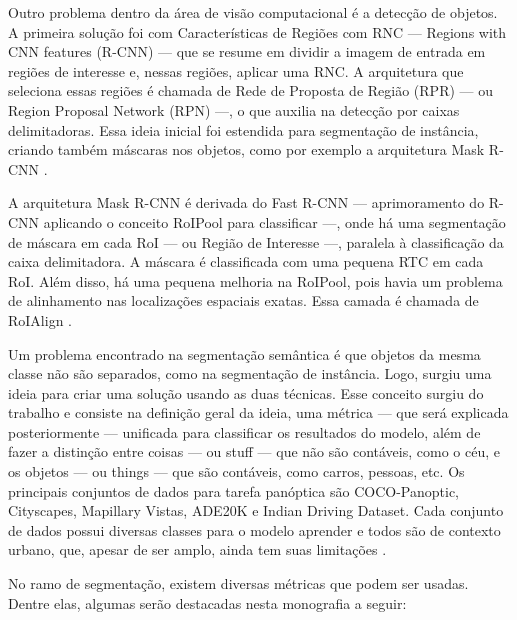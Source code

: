 Outro problema dentro da área de visão computacional é a detecção de objetos. A primeira solução foi com Características de Regiões com RNC — Regions with CNN features (R-CNN) — que se resume em dividir a imagem de entrada em regiões de interesse e, nessas regiões, aplicar uma RNC. A arquitetura que seleciona essas regiões é chamada de Rede de Proposta de Região (RPR) — ou Region Proposal Network (RPN) —, o que auxilia na detecção por caixas delimitadoras. Essa ideia inicial foi estendida para segmentação de instância, criando também máscaras nos objetos, como por exemplo a arquitetura Mask R-CNN \space\cite{dp_semantic_segmantation, lapix}.

A arquitetura Mask R-CNN é derivada do Fast R-CNN — aprimoramento do R-CNN aplicando o conceito RoIPool para classificar —, onde há uma segmentação de máscara em cada RoI — ou Região de Interesse —, paralela à classificação da caixa delimitadora. A máscara é classificada com uma pequena RTC em cada RoI. Além disso, há uma pequena melhoria na RoIPool, pois havia um problema de alinhamento nas localizações espaciais exatas. Essa camada é chamada de RoIAlign \space\cite{maskRCNN}.


Um problema encontrado na segmentação semântica é que objetos da mesma classe não são separados, como na segmentação de instância. Logo, surgiu uma ideia para criar uma solução usando as duas técnicas. Esse conceito surgiu do trabalho  e consiste na definição geral da ideia, uma métrica — que será explicada posteriormente — unificada para classificar os resultados do modelo, além de fazer a distinção entre coisas — ou stuff — que não são contáveis, como o céu, e os objetos — ou things — que são contáveis, como carros, pessoas, etc.
Os principais conjuntos de dados para tarefa panóptica são COCO-Panoptic, Cityscapes, Mapillary Vistas, ADE20K e Indian Driving Dataset. Cada conjunto de dados possui diversas classes para o modelo aprender e todos são de contexto urbano, que, apesar de ser amplo, ainda tem suas limitações \space\cite{v7labs2022panoptic}.

\label{sec:metricas_tecnicas}

No ramo de segmentação, existem diversas métricas que podem ser usadas. Dentre elas, algumas serão destacadas nesta monografia a seguir:

\label{sec:classificacao_conjuntos}


